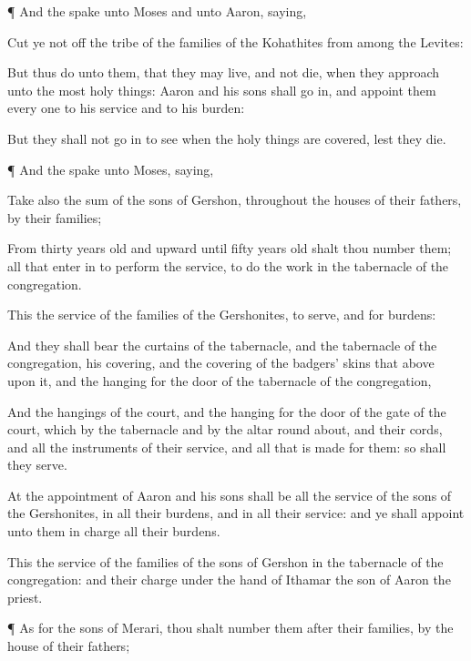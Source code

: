 {\par }{\PP {}¶ And the
{}
spake unto
Moses and unto
Aaron,
saying,

Cut ye not
off the
tribe of the
families of the
Kohathites from
among the
Levites:

But thus
do unto them, that they may
live, and not
die, when they
approach unto the
most holy
things:
Aaron and his
sons shall go
in, and
appoint them
every
one to his
service and to his
burden:

But they shall not go
in to
see when the holy
things are
covered, lest they
die.


\par }{\PP {}¶ And the
{}
spake unto
Moses,
saying,

Take also the
sum of the
sons of
Gershon, throughout the
houses of their
fathers, by their
families;

From
thirty
years
old and
upward until
fifty
years
old shalt thou
number them; all that enter
in to
perform the
service, to
do the
work in the
tabernacle of the
congregation.

This
{} the
service of the
families of the
Gershonites, to
serve, and for
burdens:

And they shall
bear the
curtains of the
tabernacle, and the
tabernacle of the
congregation, his
covering, and the
covering of the
badgers’ skins that
{}
above upon it, and the
hanging for the
door of the
tabernacle of the
congregation,

And the
hangings of the
court, and the
hanging for the
door of the
gate of the
court, which
{} by the
tabernacle and by the
altar round
about, and their
cords, and all the
instruments of their
service, and all that is
made for them: so shall they
serve.

At the
appointment of
Aaron and his
sons shall be all the
service of the
sons of the
Gershonites, in all their
burdens, and in all their
service: and ye shall
appoint unto them in
charge all their
burdens.

This
{} the
service of the
families of the
sons of
Gershon in the
tabernacle of the
congregation: and their
charge
{} under the
hand of
Ithamar the
son of
Aaron the
priest.


\par }{\PP {}¶ As for the
sons of
Merari, thou shalt
number them after their
families, by the
house of their
fathers;

}
